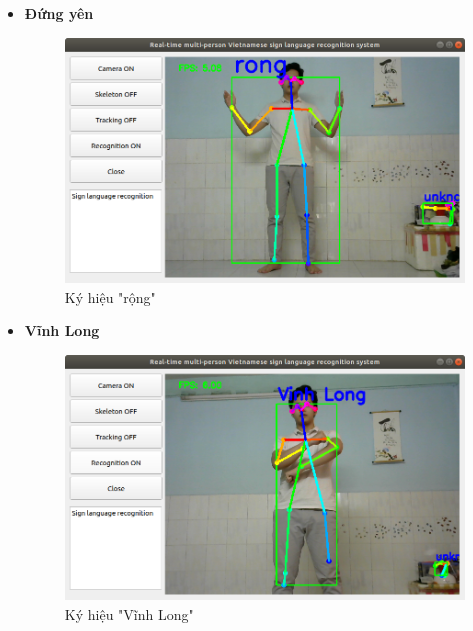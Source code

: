 \documentclass[12pt,a4paper,oneside]{book}
\numberwithin{equation}{chapter} %
\numberwithin{figure}{chapter} %
\numberwithin{table}{chapter} %
\begin{document}
\begin{itemize}
\item \textbf{Đứng yên}
\FloatBarrier
\begin{figure}[htp]
\begin{center}
\includegraphics[scale=0.4]{kq/rong.png}
\end{center}
\caption{Ký hiệu "rộng"}
\end{figure}
\FloatBarrier

\thispagestyle{phuluc}
\pagebreak
\item \textbf{Vĩnh Long}
\FloatBarrier
\begin{figure}[htp]
\begin{center}
\includegraphics[scale=0.4]{kq/vinh_long.png}
\end{center}
\caption{Ký hiệu "Vĩnh Long"}
\end{figure}
\FloatBarrier


\end{itemize}
\thispagestyle{phuluc}
\newpage


\end{document}
